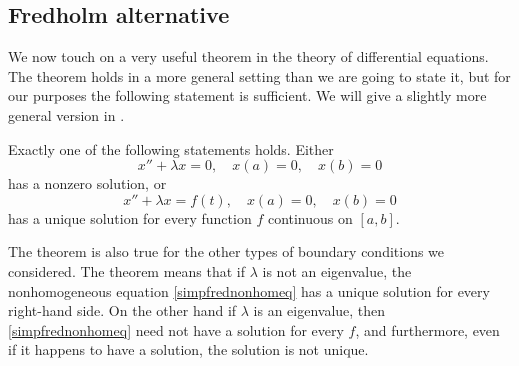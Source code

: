 %



\subsection{Fredholm alternative}

We now touch on a very useful theorem in the theory of differential
equations.  The theorem holds in a more general setting than we are
going to state it, but for our purposes the following statement is
sufficient.  We will give a slightly more general version in
.

\begin{theorem}
\label{thm:fredholmsimple}
Exactly one of the following statements holds.
Either
\begin{equation} \label{simpfredhomeq}
x'' + \lambda x = 0, \quad x(a) = 0, \quad x(b) = 0
\end{equation}
has a nonzero solution, or
\begin{equation} \label{simpfrednonhomeq}
x'' + \lambda x = f(t), \quad x(a) = 0, \quad x(b) = 0
\end{equation}
has a unique solution for every function $f$ continuous on $[a,b]$.
\end{theorem}

The theorem is also true for the other types of
boundary conditions we considered.
The theorem means that if $\lambda$ is not an eigenvalue, the nonhomogeneous
equation \eqref{simpfrednonhomeq} has a unique solution for every right-hand
side.  On the other hand if $\lambda$ is an eigenvalue, then 
\eqref{simpfrednonhomeq} need not have a solution for every $f$,
and furthermore,
even if it happens to have a solution, the solution is not
unique.


